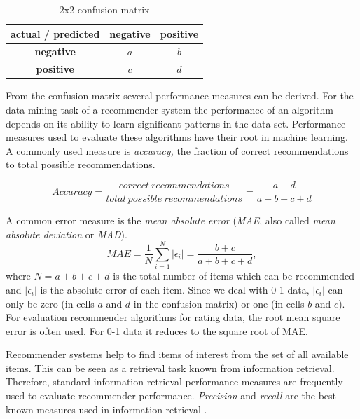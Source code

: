 \documentclass[nojss]{jss}
\begin{document}
\begin{table}[tbp]
\caption{2x2 confusion matrix
\label{tab_confusion}
}
\center
\begin{tabular}{|c||c|c|} 
\hline
{\bf actual / predicted} & {\bf negative}  & {\bf positive} \\
\hline
\hline
{\bf negative} & $a$ & $b$ \\
\hline
{\bf positive} & $c$ & $d$ \\
\hline
\end{tabular}
\end{table}

From the confusion matrix several performance measures can be derived.
For the data mining task of a recommender system 
the performance of an algorithm depends on its ability
to learn significant patterns in the data set.
Performance measures used to evaluate these algorithms 
have their root in machine learning.
A commonly used measure is
{\em accuracy,} the fraction of correct 
recommendations to total possible recommendations.

\begin{equation} 
\mathit{Accuracy} = \frac{\mathit{correct\ recommendations}}{\mathit{total\ possible\ recommendations}}
=  \frac{a+d}{a+b+c+d}
\label{accur}
\end{equation} 

A common error measure is the {\em mean absolute error} ({\em MAE}, also called {\em mean absolute deviation} or {\em MAD}).
\begin{equation} 
\mathit{MAE} = \frac{1}{N}\sum_{i=1}^N{|\epsilon_i|} = \frac{b+c}{a+b+c+d},
\label{mae}
\end{equation} 
where $N = a+b+c+d$ is the total number of items 
which can be recommended and $|\epsilon_i|$ is the
absolute error of each item.
Since we deal with 0-1 data, $|\epsilon_i|$ can only be zero (in cells $a$ and $d$ in the confusion matrix) or one (in cells $b$ and $c$).
For evaluation recommender algorithms for rating data, the root mean square 
error is often used. For 0-1 data it reduces to the square 
root of MAE.  

Recommender systems help to find items of interest from the set of all 
available items. This can be seen as a retrieval task known from 
information retrieval. Therefore, standard information retrieval
performance measures are frequently used to evaluate recommender performance.
{\em Precision} and {\em recall} are the best known measures used in 
information retrieval \citep{recommender:Salton:1983,recommender:Rijsbergen:1979}. 
\end{document}
